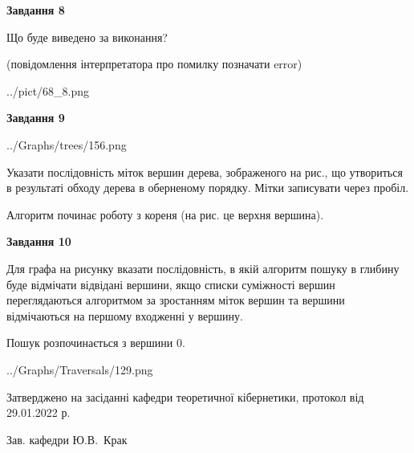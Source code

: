 \documentclass[12pt, ukrainian]{article}
\begin{document}
{\begin {large}
{\begin {center}\textbf{Завдання 8}\end {center}}\par
Що буде виведено за виконання?\par
 (повідомлення інтерпретатора про помилку позначати error)\par
\begin{center}
	{../pict/68_8.png}
\end{center}
\newpage

{\begin {center}\textbf{Завдання 9}\end {center}}\par

\begin{center}
	{../Graphs/trees/156.png}
\end{center}
Указати послідовність міток вершин дерева, зображеного на рис., що утвориться в результаті обходу дерева в оберненому порядку. Мітки записувати через пробіл.\par Алгоритм починає роботу з кореня (на рис. це верхня вершина).\par
\newpage

{\begin {center}\textbf{Завдання 10}\end {center}}\par
Для графа на рисунку вказати послідовність, в якій алгоритм пошуку в глибину буде відмічати відвідані вершини, якщо списки суміжності вершин переглядаються алгоритмом за зростанням міток вершин та вершини відмічаються на першому вход\-женні у вершину.\par
Пошук розпочинається з вершини 0.\par

\begin{center}
	{../Graphs/Traversals/129.png}
\end{center}\par
\newpage


\end {large}
}
{\smallskip \begin {small} Затверджено на засіданні кафедри теоретичної кібернетики, протокол  від   29.01.2022 р.\par\smallskip\smallskip
{\parbox {6.5 cm}{Зав. кафедри \dotfill Ю.В.~Крак}} \end{small}}
\end{document}

